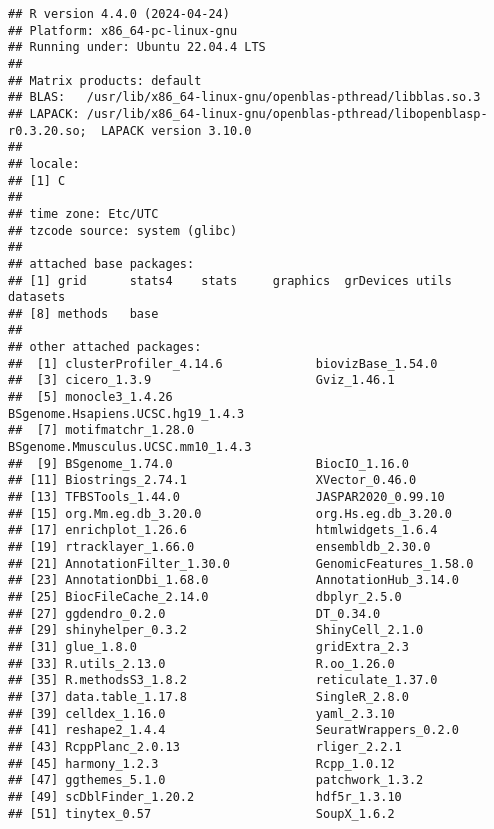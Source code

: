 \documentclass[
  11pt,
  a4paper,
]{article}
\begin{document}
\begin{verbatim}
## R version 4.4.0 (2024-04-24)
## Platform: x86_64-pc-linux-gnu
## Running under: Ubuntu 22.04.4 LTS
## 
## Matrix products: default
## BLAS:   /usr/lib/x86_64-linux-gnu/openblas-pthread/libblas.so.3 
## LAPACK: /usr/lib/x86_64-linux-gnu/openblas-pthread/libopenblasp-r0.3.20.so;  LAPACK version 3.10.0
## 
## locale:
## [1] C
## 
## time zone: Etc/UTC
## tzcode source: system (glibc)
## 
## attached base packages:
## [1] grid      stats4    stats     graphics  grDevices utils     datasets 
## [8] methods   base     
## 
## other attached packages:
##  [1] clusterProfiler_4.14.6             biovizBase_1.54.0                 
##  [3] cicero_1.3.9                       Gviz_1.46.1                       
##  [5] monocle3_1.4.26                    BSgenome.Hsapiens.UCSC.hg19_1.4.3 
##  [7] motifmatchr_1.28.0                 BSgenome.Mmusculus.UCSC.mm10_1.4.3
##  [9] BSgenome_1.74.0                    BiocIO_1.16.0                     
## [11] Biostrings_2.74.1                  XVector_0.46.0                    
## [13] TFBSTools_1.44.0                   JASPAR2020_0.99.10                
## [15] org.Mm.eg.db_3.20.0                org.Hs.eg.db_3.20.0               
## [17] enrichplot_1.26.6                  htmlwidgets_1.6.4                 
## [19] rtracklayer_1.66.0                 ensembldb_2.30.0                  
## [21] AnnotationFilter_1.30.0            GenomicFeatures_1.58.0            
## [23] AnnotationDbi_1.68.0               AnnotationHub_3.14.0              
## [25] BiocFileCache_2.14.0               dbplyr_2.5.0                      
## [27] ggdendro_0.2.0                     DT_0.34.0                         
## [29] shinyhelper_0.3.2                  ShinyCell_2.1.0                   
## [31] glue_1.8.0                         gridExtra_2.3                     
## [33] R.utils_2.13.0                     R.oo_1.26.0                       
## [35] R.methodsS3_1.8.2                  reticulate_1.37.0                 
## [37] data.table_1.17.8                  SingleR_2.8.0                     
## [39] celldex_1.16.0                     yaml_2.3.10                       
## [41] reshape2_1.4.4                     SeuratWrappers_0.2.0              
## [43] RcppPlanc_2.0.13                   rliger_2.2.1                      
## [45] harmony_1.2.3                      Rcpp_1.0.12                       
## [47] ggthemes_5.1.0                     patchwork_1.3.2                   
## [49] scDblFinder_1.20.2                 hdf5r_1.3.10                      
## [51] tinytex_0.57                       SoupX_1.6.2                       

\end{verbatim}
\end{document}
